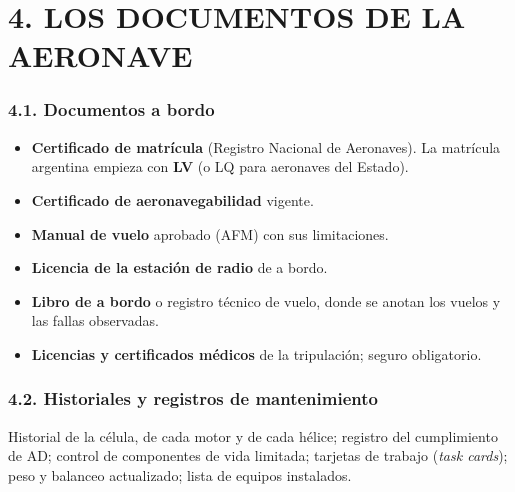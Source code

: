 \section*{4. LOS DOCUMENTOS DE LA AERONAVE}

\subsubsection*{4.1. Documentos a bordo}
\begin{itemize}
  \item \textbf{Certificado de matrícula} (Registro Nacional de Aeronaves). La matrícula argentina
        empieza con \textbf{LV} (o LQ para aeronaves del Estado).
  \item \textbf{Certificado de aeronavegabilidad} vigente.
  \item \textbf{Manual de vuelo} aprobado (AFM) con sus limitaciones.
  \item \textbf{Licencia de la estación de radio} de a bordo.
  \item \textbf{Libro de a bordo} o registro técnico de vuelo, donde se anotan los vuelos y las
        fallas observadas.
  \item \textbf{Licencias y certificados médicos} de la tripulación; seguro obligatorio.
\end{itemize}

\subsubsection*{4.2. Historiales y registros de mantenimiento}
Historial de la célula, de cada motor y de cada hélice; registro del cumplimiento de AD;
control de componentes de vida limitada; tarjetas de trabajo (\textit{task cards}); peso y
balanceo actualizado; lista de equipos instalados.

